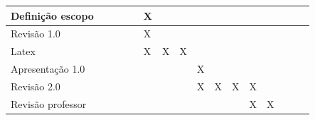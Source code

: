 \begin{table}[H]
\begin{tabular}{|p{2.5cm}|p{0.5cm}|p{0.5cm}|p{0.5cm}|p{0.5cm}|p{0.5cm}|p{0.5cm}|p{0.5cm}|p{0.5cm}|p{0.5cm}|p{0.5cm}|p{0.5cm}|p{0.5cm}|p{0.5cm}|p{0.5cm}|p{0.5cm}|}
Definição escopo               &                           &                           &                           &                           & \cellcolor[HTML]{3166FF}X &                           &                           &                           &                           &                           &                           &                           &       &       &                           \\ \hline
Revisão 1.0                    &                           &                           &                           &                           & \cellcolor[HTML]{3166FF}X &                           &                           &                           &                           &                           &                           &                           &       &       &                           \\ \hline
Latex                          &                           &                           &                           &                           & \cellcolor[HTML]{3166FF}X & \cellcolor[HTML]{3166FF}X & \cellcolor[HTML]{3166FF}X &                           &                           &                           &                           &                           &       &       &                           \\ \hline
Apresentação 1.0               &                           &                           &                           &                           &                           &                           &                           & \cellcolor[HTML]{3166FF}X &                           &                           &                           &                           &       &       &                           \\ \hline
Revisão 2.0                    &                           &                           &                           &                           &                           &                           &                           & \cellcolor[HTML]{3166FF}X & \cellcolor[HTML]{3166FF}X & \cellcolor[HTML]{3166FF}X & \cellcolor[HTML]{3166FF}X &                           &       &       &                           \\ \hline
Revisão professor              &                           &                           &                           &                           &                           &                           &                           &                           &                           &                           & \cellcolor[HTML]{3166FF}X & \cellcolor[HTML]{3166FF}X &       &       &                           \\ \hline

\end{tabular}
\end{table}
